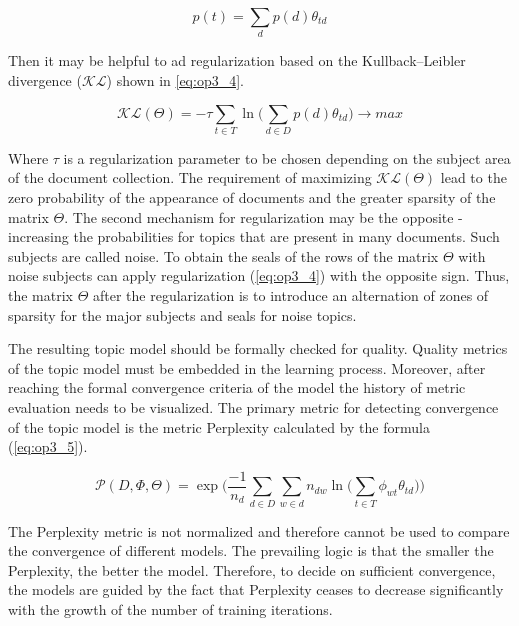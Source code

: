 \documentclass[12pt]{report}
\theoremstyle{definition}
\begin{document}
\begin{equation} 
\label{eq:op3_3}
p \left( t \right) = \sum_d p \left( d \right)  \theta_{td}
\end{equation}

Then it may be helpful to ad regularization based on the Kullback–Leibler divergence ($\mathcal{KL}$)  shown in \ref{eq:op3_4}.

\begin{equation} 
\label{eq:op3_4}
\mathcal{KL}(\Theta)= -\tau \sum_{t \in T} \ln \bigg( \sum_{d \in D} p \left( d \right) \theta_{td} \bigg) \rightarrow max
\end{equation}

Where $\tau$ is a regularization parameter to be chosen depending on the subject area of the document collection. 
The requirement of maximizing $\mathcal{KL}(\Theta)$ lead to the zero probability of the appearance of documents and the greater sparsity of the matrix $\Theta$.
The second mechanism for regularization may be the opposite - increasing the probabilities for topics that are present in many documents. 
Such subjects are called noise. 
To obtain the seals of the rows of the matrix $\Theta$ with noise subjects can apply regularization (\ref{eq:op3_4}) with the opposite sign. 
Thus, the matrix $\Theta$ after the regularization is to introduce an alternation of zones of sparsity for the major subjects and seals for noise topics. 

The resulting topic model should be formally checked for quality. 
Quality metrics of the topic model must be embedded in the learning process. 
Moreover, after reaching the formal convergence criteria of the model the history of metric evaluation needs to be visualized. 
The primary metric for detecting convergence of the topic model is the metric Perplexity calculated by the formula (\ref{eq:op3_5}).

\begin{equation} 
\label{eq:op3_5}
\mathcal{P}(D, \Phi, \Theta) = \exp \bigg( \frac{-1}{n_d} \sum_{d \in D}  \sum_{w \in d}  n_{dw} \ln \bigg( \sum_{t \in T} \phi_{wt} \theta_{td} \bigg ) \bigg)
\end{equation}

The Perplexity metric is not normalized and therefore cannot be used to compare the convergence of different models. 
The prevailing logic is that the smaller the Perplexity, the better the model. 
Therefore, to decide on sufficient convergence, the models are guided by the fact that Perplexity ceases to decrease significantly with the growth of the number of training iterations.
\end{document}
